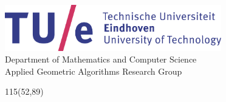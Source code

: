 \begin{titlepage}
\begin{center}
\includegraphics[height=2cm]{tue-logo-high}\\
\large
Department of Mathematics and Computer Science  \\
Applied Geometric Algorithms Research Group

\vspace*{10cm}

\setlength{\TPHorizModule}{1mm}
\setlength{\TPVertModule}{\TPHorizModule}
\newlength{\backupparindent}
\setlength{\backupparindent}{\parindent}
\setlength{\parindent}{0mm}
\begin{textblock}{115}(52,89)
    \vspace*{1mm}
    \huge
    \textbf{\doctitle \\}
    \Large
    \vspace*{10mm}
    \me\\
    \vspace{30mm}


\end{textblock}
\end{center}
\end{titlepage}

